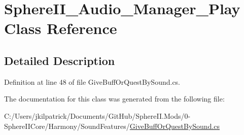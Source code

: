 \hypertarget{class_sphere_i_i___audio___manager___play}{}\section{Sphere\+I\+I\+\_\+\+Audio\+\_\+\+Manager\+\_\+\+Play Class Reference}
\label{class_sphere_i_i___audio___manager___play}


\subsection{Detailed Description}


Definition at line 48 of file Give\+Buff\+Or\+Quest\+By\+Sound.\+cs.



The documentation for this class was generated from the following file\+:\begin{DoxyCompactItemize}
\item 
C\+:/\+Users/jkilpatrick/\+Documents/\+Git\+Hub/\+Sphere\+I\+I.\+Mods/0-\/\+Sphere\+I\+I\+Core/\+Harmony/\+Sound\+Features/\mbox{\hyperlink{_give_buff_or_quest_by_sound_8cs}{Give\+Buff\+Or\+Quest\+By\+Sound.\+cs}}\end{DoxyCompactItemize}
